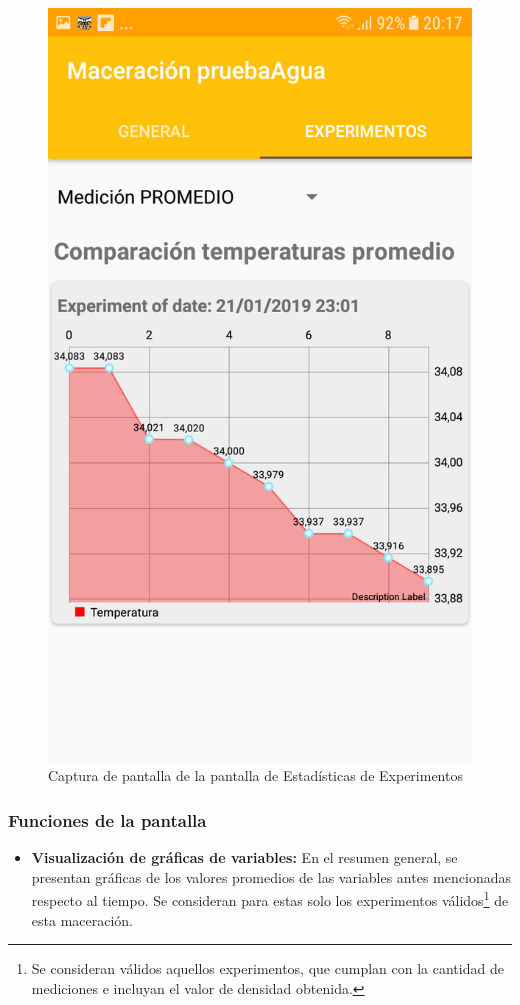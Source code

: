             \begin{figure}[h]
                \centering
                \includegraphics[scale=0.2]{software/ScreenCapture/ExperimentStatistics.jpg}
                \caption{Captura de pantalla de la pantalla de Estadísticas de Experimentos}
                \label{fig:CapturaExpFrag}
            \end{figure}
            
            \subsubsection{Funciones de la pantalla}
            \begin{itemize}
                \item \textbf{Visualización de gráficas de variables:} En el resumen general, se presentan gráficas de los valores promedios de las variables antes mencionadas respecto al tiempo. Se consideran para estas solo los experimentos válidos\footnote{Se consideran válidos aquellos experimentos, que cumplan con la cantidad de mediciones e incluyan el valor de densidad obtenida.} de esta maceración.
            \end{itemize}
            
